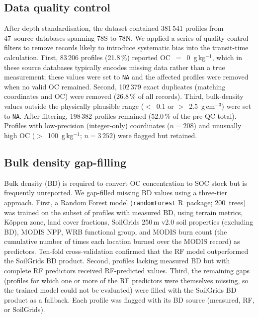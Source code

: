 \documentclass[12pt, a4paper]{article}
\begin{document}
\subsection{Data quality control}
\label{sec:qc}

After depth standardisation, the dataset contained 381\,541 profiles from
47~source databases spanning 78\textdegree S to 78\textdegree N. We applied
a series of quality-control filters to remove records likely to introduce
systematic bias into the transit-time calculation. First, 83\,206 profiles
(21.8\,\%) reported OC~$=$~0~g\,kg$^{-1}$, which in these source
databases typically encodes missing data rather than a true measurement; these values were set
to \texttt{NA} and the affected profiles were removed when no valid OC
remained. Second, 102\,379 exact duplicates (matching coordinates and OC)
were removed (26.8\,\% of all records). Third, bulk-density values outside
the physically plausible range ($<$~0.1 or $>$~2.5~g\,cm$^{-3}$) were set
to \texttt{NA}. After filtering, 198\,382 profiles remained (52.0\,\% of
the pre-QC total). Profiles with low-precision (integer-only) coordinates
($n = 208$) and unusually high OC ($>$~100~g\,kg$^{-1}$; $n = 3\,252$)
were flagged but retained.

\subsection{Bulk density gap-filling}
\label{sec:bd}

Bulk density (BD) is required to convert OC concentration to SOC stock
but is frequently unreported. We gap-filled missing BD values using a
three-tier approach. First, a Random Forest model
(\texttt{randomForest} R~package; 200~trees) was trained on the subset
of profiles with measured BD, using terrain metrics, K\"oppen zone, land
cover fractions, SoilGrids 250\,m v2.0 soil properties \citep{Poggio2021}
(excluding BD), MODIS NPP,
WRB functional group, and MODIS burn count (the cumulative number of
times each location burned over the MODIS record) as predictors. Ten-fold
cross-validation confirmed that the RF model outperformed the SoilGrids
BD product. Second, profiles lacking measured
BD but with complete RF predictors received RF-predicted values. Third,
the remaining gaps (profiles for which one or more of the RF predictors
were themselves missing, so the trained model could not be evaluated)
were filled with the SoilGrids BD product as a fallback. Each profile
was flagged with its BD source (measured, RF, or SoilGrids).
\end{document}
